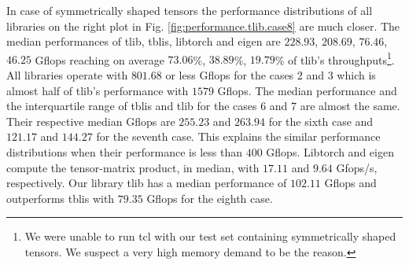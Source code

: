In case of symmetrically shaped tensors the performance distributions of all libraries on the right plot in Fig. \ref{fig:performance.tlib.case8} are much closer.
The median performances of tlib, tblis, libtorch and eigen are $228.93$, $208.69$, $76.46$, $46.25$ Gflops reaching on average $73.06$\%, $38.89$\%, $19.79$\% of tlib's throughputs\footnote{We were unable to run tcl with our test set containing symmetrically shaped tensors. We suspect a very high memory demand to be the reason.}.
All libraries operate with $801.68$ or less Gflops for the cases 2 and 3 which is almost half of tlib's performance with $1579$ Gflops.
The median performance and the interquartile range of tblis and tlib for the cases 6 and 7 are almost the same.
Their respective median Gflops are $255.23$ and $263.94$ for the sixth case and $121.17$ and $144.27$ for the seventh case.
This explains the similar performance distributions when their performance is less than $400$ Gflops.
Libtorch and eigen compute the tensor-matrix product, in median, with $17.11$ and $9.64$ Gfops/s, respectively.
Our library tlib has a median performance of $102.11$ Gflops and outperforms tblis with $79.35$ Gflops for the eighth case.


